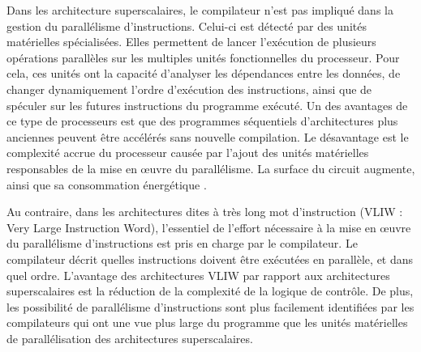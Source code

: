 Dans les architecture superscalaires, le compilateur n'est pas impliqué dans la gestion du parallélisme d'instructions. Celui-ci est détecté par des unités matérielles spécialisées. 
Elles permettent de lancer l'exécution de plusieurs opérations parallèles sur les multiples unités fonctionnelles du processeur.
Pour cela, ces unités ont la capacité d'analyser les dépendances entre les données, de changer dynamiquement l'ordre d'exécution des instructions, ainsi que de spéculer sur les futures instructions du programme exécuté. 
Un des avantages de ce type de processeurs est que des programmes séquentiels d'architectures plus anciennes peuvent être accélérés sans nouvelle compilation. Le désavantage est le complexité accrue du processeur causée par l'ajout des unités matérielles responsables de la mise en œuvre du parallélisme. La surface du circuit augmente, ainsi que sa consommation énergétique \cite{rau1993instruction}.

Au contraire, dans les architectures dites \og à très long mot d'instruction \fg (VLIW : Very Large Instruction Word), l'essentiel de l'effort nécessaire à la mise en œuvre du parallélisme d'instructions est pris en charge par le compilateur. Le compilateur décrit quelles instructions doivent être exécutées en parallèle, et dans quel ordre. L'avantage des architectures VLIW par rapport aux architectures superscalaires est la réduction de la complexité de la logique de contrôle. De plus, les possibilité de parallélisme d'instructions sont plus facilement identifiées par les compilateurs qui ont une vue plus large du programme que les unités matérielles de parallélisation des architectures superscalaires.


